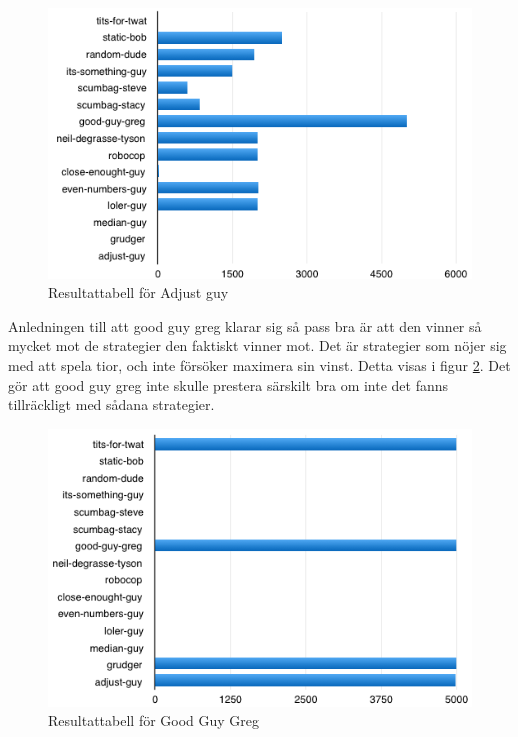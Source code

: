 \begin{figure}[H]
	\begin{center}
	\includegraphics[scale=0.75, angle=0]{bilder/adjust-guy.png}
	\caption{Resultattabell för Adjust guy}
	\label{adjust-guy}
	\end{center}
\end{figure}

\newpage

Anledningen till att good guy greg klarar sig så pass bra är att den vinner så mycket mot de strategier den faktiskt vinner mot. Det är strategier som nöjer sig med att spela tior, och inte försöker maximera sin vinst. Detta visas i figur \ref{good-guy-greg}. Det gör att good guy greg inte skulle prestera särskilt bra om inte det fanns tillräckligt med sådana strategier. 

\begin{figure}[H]
	\begin{center}
	\includegraphics[scale=0.75, angle=0]{bilder/good-guy-greg.png}
	\caption{Resultattabell för Good Guy Greg}
	\label{good-guy-greg}
	\end{center}
\end{figure}

